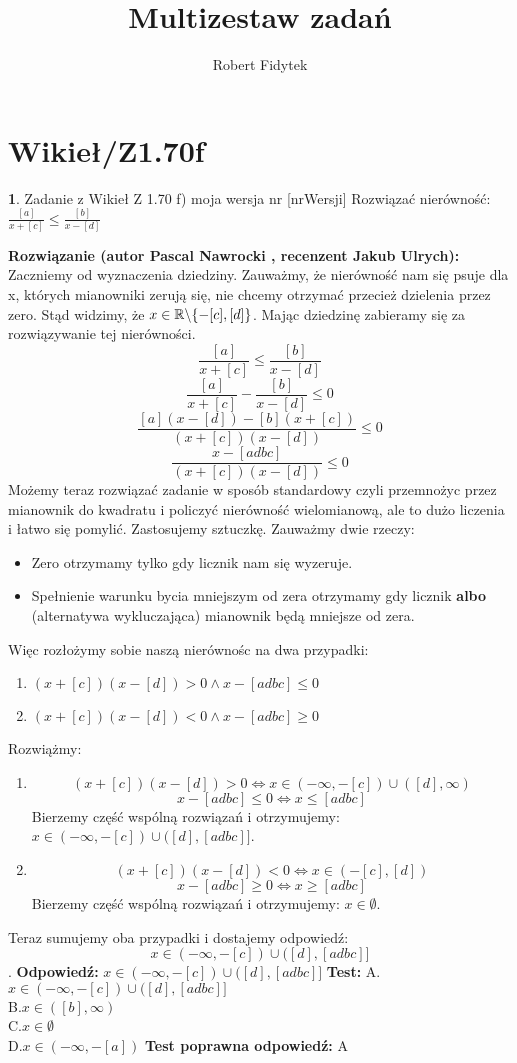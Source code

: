 \documentclass[12pt, a4paper]{article}
\title{Multizestaw zadań}
\author{Robert Fidytek}
\date{}
\theoremstyle{definition} %
\newtheorem{zad}{}
\newcommand{\kategoria}[1]{\section{#1}} %
\newcommand{\zadStart}[1]{\begin{zad}#1\newline} %
\newcommand{\zadStop}{\end{zad}}   %
\newcommand{\rozwStart}[2]{\noindent \textbf{Rozwiązanie (autor #1 , recenzent #2): }\newline} %
\newcommand{\odpStart}{\noindent \textbf{Odpowiedź:}\newline}    %
\newcommand{\odpStop}{\newline}                                             %
\newcommand{\testStart}{\noindent \textbf{Test:}\newline} %
\newcommand{\testStop}{\newline} %
\newcommand{\kluczStart}{\noindent \textbf{Test poprawna odpowiedź:}\newline} %
\newcommand{\kluczStop}{\newline} %
\begin{document}
\maketitle


\kategoria{Wikieł/Z1.70f}
\zadStart{Zadanie z Wikieł Z 1.70 f) moja wersja nr [nrWersji]}
Rozwiązać nierówność: $\frac{[a]}{x+[c]}\leq\frac{[b]}{x-[d]}$
\zadStop
\rozwStart{Pascal Nawrocki}{Jakub Ulrych}
Zaczniemy od wyznaczenia dziedziny. Zauważmy, że nierówność nam się psuje dla x, których mianowniki zerują się, nie chcemy otrzymać przecież dzielenia przez zero. Stąd widzimy, że $x\in\mathbb{R}\symbol{92}\{-[c],[d]\}$. Mając dziedzinę zabieramy się za rozwiązywanie tej nierówności.
$$\frac{[a]}{x+[c]}\leq\frac{[b]}{x-[d]}$$
$$\frac{[a]}{x+[c]}-\frac{[b]}{x-[d]}\leq0$$
$$\frac{[a](x-[d])-[b](x+[c])}{(x+[c])(x-[d])}\leq0$$
$$\frac{x-[adbc]}{(x+[c])(x-[d])}\leq0$$
Możemy teraz rozwiązać zadanie w sposób standardowy czyli przemnożyc przez mianownik do kwadratu i policzyć nierówność wielomianową, ale to dużo liczenia i łatwo się pomylić. Zastosujemy sztuczkę. Zauważmy dwie rzeczy:
\begin{itemize}
\item Zero otrzymamy tylko gdy licznik nam się wyzeruje.
\item Spełnienie warunku bycia mniejszym od zera otrzymamy gdy licznik \textbf{albo} (alternatywa wykluczająca) mianownik będą mniejsze od zera. 
\end{itemize}
Więc rozłożymy sobie naszą nierównośc na dwa przypadki:
\begin{enumerate}
\item $(x+[c])(x-[d])>0 \wedge x-[adbc]\leq0$
\item  $(x+[c])(x-[d])<0 \wedge x-[adbc]\geq0$
\end{enumerate}
Rozwiążmy:
\begin{enumerate}
\item 
$$(x+[c])(x-[d])>0\Leftrightarrow x\in(-\infty,-[c])\cup([d],\infty)$$
$$x-[adbc]\leq0\Leftrightarrow x\leq[adbc]$$
Bierzemy część wspólną rozwiązań i otrzymujemy: $x\in(-\infty,-[c])\cup([d],[adbc]]$.
\item 
$$(x+[c])(x-[d])<0\Leftrightarrow x\in(-[c],[d])$$
$$ x-[adbc]\geq0\Leftrightarrow  x\geq[adbc]$$
Bierzemy część wspólną rozwiązań i otrzymujemy: $x\in\emptyset$.
\end{enumerate}
Teraz sumujemy oba przypadki i dostajemy odpowiedź:
$$x\in(-\infty,-[c])\cup([d],[adbc]]$$.
\odpStart
$x\in(-\infty,-[c])\cup([d],[adbc]]$
\odpStop
\testStart
A.$x\in(-\infty,-[c])\cup([d],[adbc]]$
\\
B.$x\in([b],\infty)$
\\
C.$x\in\emptyset$
\\
D.$x\in(-\infty,-[a])$
\testStop
\kluczStart
A
\kluczStop
\end{document}
